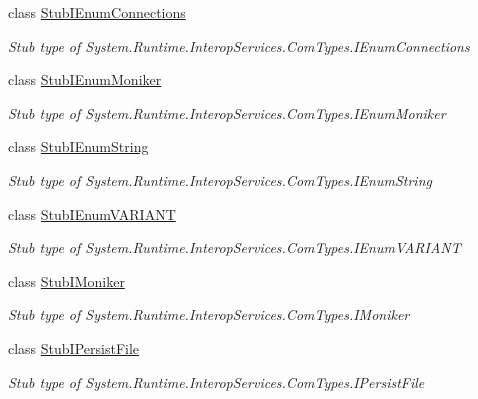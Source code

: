\begin{DoxyCompactItemize}
class \hyperlink{class_system_1_1_runtime_1_1_interop_services_1_1_com_types_1_1_fakes_1_1_stub_i_enum_connections}{Stub\-I\-Enum\-Connections}
\begin{DoxyCompactList}\small\item\em Stub type of System.\-Runtime.\-Interop\-Services.\-Com\-Types.\-I\-Enum\-Connections\end{DoxyCompactList}\item 
class \hyperlink{class_system_1_1_runtime_1_1_interop_services_1_1_com_types_1_1_fakes_1_1_stub_i_enum_moniker}{Stub\-I\-Enum\-Moniker}
\begin{DoxyCompactList}\small\item\em Stub type of System.\-Runtime.\-Interop\-Services.\-Com\-Types.\-I\-Enum\-Moniker\end{DoxyCompactList}\item 
class \hyperlink{class_system_1_1_runtime_1_1_interop_services_1_1_com_types_1_1_fakes_1_1_stub_i_enum_string}{Stub\-I\-Enum\-String}
\begin{DoxyCompactList}\small\item\em Stub type of System.\-Runtime.\-Interop\-Services.\-Com\-Types.\-I\-Enum\-String\end{DoxyCompactList}\item 
class \hyperlink{class_system_1_1_runtime_1_1_interop_services_1_1_com_types_1_1_fakes_1_1_stub_i_enum_v_a_r_i_a_n_t}{Stub\-I\-Enum\-V\-A\-R\-I\-A\-N\-T}
\begin{DoxyCompactList}\small\item\em Stub type of System.\-Runtime.\-Interop\-Services.\-Com\-Types.\-I\-Enum\-V\-A\-R\-I\-A\-N\-T\end{DoxyCompactList}\item 
class \hyperlink{class_system_1_1_runtime_1_1_interop_services_1_1_com_types_1_1_fakes_1_1_stub_i_moniker}{Stub\-I\-Moniker}
\begin{DoxyCompactList}\small\item\em Stub type of System.\-Runtime.\-Interop\-Services.\-Com\-Types.\-I\-Moniker\end{DoxyCompactList}\item 
class \hyperlink{class_system_1_1_runtime_1_1_interop_services_1_1_com_types_1_1_fakes_1_1_stub_i_persist_file}{Stub\-I\-Persist\-File}
\begin{DoxyCompactList}\small\item\em Stub type of System.\-Runtime.\-Interop\-Services.\-Com\-Types.\-I\-Persist\-File\end{DoxyCompactList}\item 

\end{DoxyCompactItemize}
